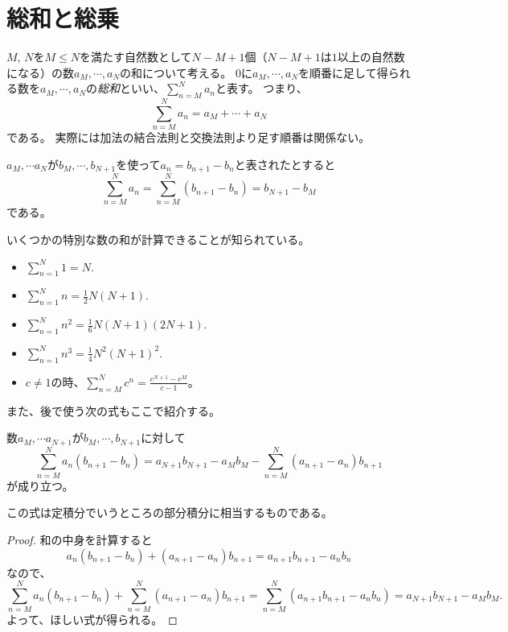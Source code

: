\section{総和と総乗}

$M$, $N$を$M \le N$を満たす自然数として$N-M+1$個（$N-M+1$は$1$以上の自然数になる）の数$a_M, \cdots, a_N$の和について考える。
$0$に$a_M, \cdots, a_N$を順番に足して得られる数を$a_M, \cdots, a_N$の\emph{総和}といい、$\sum_{n = M}^N a_n$と表す。
つまり、
$$
\sum_{n = M}^N a_n = a_M+\cdots+a_N
$$
である。
実際には加法の結合法則と交換法則より足す順番は関係ない。

\begin{proposition}
$a_M, \cdots a_N$が$b_M, \cdots, b_{N+1}$を使って$a_n = b_{n+1}-b_n$と表されたとすると
$$
\sum_{n = M}^N a_n = \sum_{n = M}^N(b_{n+1}-b_n) = b_{N+1}-b_M
$$
である。
\end{proposition}

いくつかの特別な数の和が計算できることが知られている。

\begin{proposition}[和の公式]
\begin{itemize}
\item
$\sum_{n = 1}^N 1 = N$.
\item
$\sum_{n = 1}^N n = \frac{1}{2}N(N+1)$.
\item
$\sum_{n = 1}^N n^2 = \frac{1}{6}N(N+1)(2 N+1)$.
\item
$\sum_{n = 1}^N n^3 = \frac{1}{4}N^2(N+1)^2$.
\item
$c \ne 1$の時、$\sum_{n = M}^N c^n = \frac{c^{N+1}-c^M}{c-1}$。
\end{itemize}
\end{proposition}

また、後で使う次の式もここで紹介する。

\begin{proposition}[部分和分]
\label{t_sum_part}
数$a_M, \cdots a_{N+1}$が$b_M, \cdots, b_{N+1}$に対して
$$
\sum_{n = M}^N a_n(b_{n+1}-b_n) = a_{N+1}b_{N+1}-a_M b_M-\sum_{n = M}^N (a_{n+1}-a_n)b_{n+1}
$$
が成り立つ。
\end{proposition}

この式は定積分でいうところの部分積分に相当するものである。

\begin{proof}
和の中身を計算すると
$$
a_n(b_{n+1}-b_n)+(a_{n+1}-a_n)b_{n+1} = a_{n+1}b_{n+1}-a_n b_n
$$
なので、
$$
\sum_{n = M}^N a_n(b_{n+1}-b_n)+\sum_{n = M}^N (a_{n+1}-a_n)b_{n+1} = \sum_{n = M}^N (a_{n+1}b_{n+1}-a_n b_n) = a_{N+1}b_{N+1}-a_M b_M.
$$
よって、ほしい式が得られる。
\end{proof}

